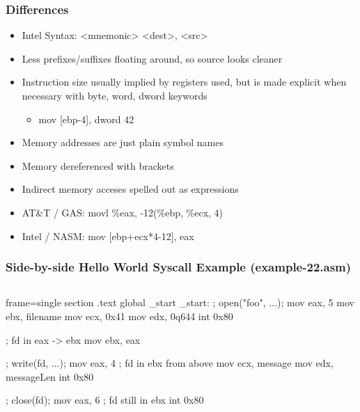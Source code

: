 \documentclass[11pt,xcolor=dvipsnames]{beamer}
\newcommand{\vs}{\vspace{0.5em}}
\newcommand{\mvs}{\vspace{-0.95em}}
\begin{document}
\begin{frame}[fragile,t]
\frametitle{Differences}
\begin{itemize}
  \item Intel Syntax: {\ttfamily <mnemonic> <dest>, <src>}
  \item Less prefixes/suffixes floating around, so source looks cleaner
  \item Instruction size usually implied by registers used, but is made explicit when necessary with {\ttfamily byte, word, dword} keywords
  \begin{itemize}
    \item {\ttfamily mov [ebp-4], dword 42}
  \end{itemize}
  \pause
  \item Memory addresses are just plain symbol names
  \item Memory dereferenced with brackets {\ttfamily [ ... ]}
  \pause
  \vs
  \item Indirect memory acceses spelled out as expressions
  \item AT\&T / GAS: {\ttfamily movl \%eax, -12(\%ebp, \%ecx, 4)}
  \item Intel / NASM: {\ttfamily mov [ebp+ecx*4-12], eax}
\end{itemize}
\end{frame}

\begin{frame}[fragile,t]
\frametitle{Side-by-side Hello World Syscall Example (example-22.asm)}
\mvs \mvs
\begin{columns}[T]
\begin{nasmcode*}{frame=single}
section .text
global _start
_start:
  ; open("foo", ...);
  mov eax, 5
  mov ebx, filename
  mov ecx, 0x41
  mov edx, 0q644
  int 0x80

  ; fd in eax -> ebx
  mov ebx, eax

  ; write(fd, ...);
  mov eax, 4
  ; fd in ebx from above
  mov ecx, message
  mov edx, messageLen
  int 0x80

  ; close(fd);
  mov eax, 6
  ; fd still in ebx
  int 0x80
\end{nasmcode*}
\end{columns}
\end{frame}
\end{document}
